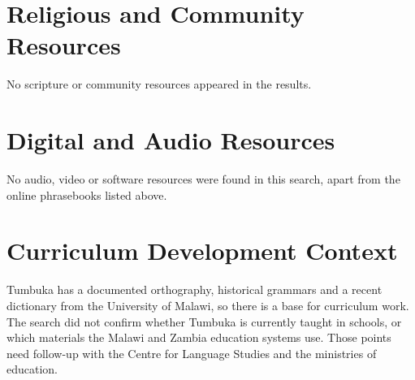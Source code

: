 \documentclass[12pt]{article}
\begin{document}
\section{Religious and Community Resources}
No scripture or community resources appeared in the results.

\section{Digital and Audio Resources}
No audio, video or software resources were found in this search, apart from the online phrasebooks listed above.

\section{Curriculum Development Context}
Tumbuka has a documented orthography, historical grammars and a recent dictionary from the University of Malawi, so there is a base for curriculum work. The search did not confirm whether Tumbuka is currently taught in schools, or which materials the Malawi and Zambia education systems use. Those points need follow-up with the Centre for Language Studies and the ministries of education.
\end{document}
